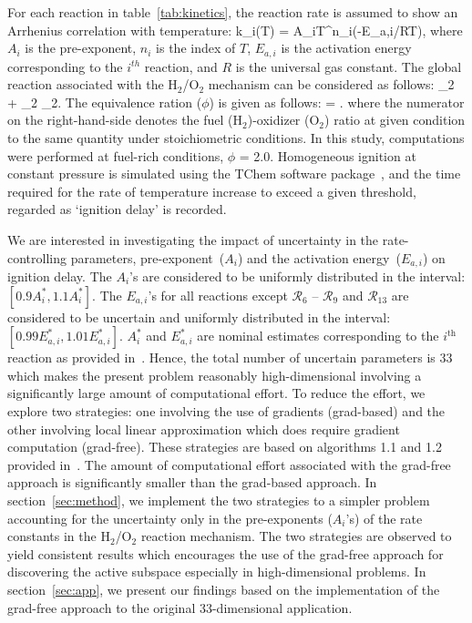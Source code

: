 For each reaction in table~\ref{tab:kinetics}, the reaction rate is assumed to show an Arrhenius
correlation with temperature:
%
\be
k_i(T) = A_iT^{n_i}\exp(-E_{a,i}/RT), 
\label{eq:rate}
\ee
%
where $A_i$ is the pre-exponent, $n_i$ is the index of $T$, $E_{a,i}$ is the
activation energy corresponding to the $i^{th}$ reaction, and $R$ is the
universal gas constant.  The global reaction associated with the H$_2$/O$_2$ mechanism can
be considered as follows:
%
_2 + _2 _2.
\label{eq:global}
\ee 
%
The equivalence ration ($\phi$) is given as follows:
%
\be
\phi = .
\label{eq:phi}
\ee
%
where the numerator on the right-hand-side denotes the fuel (H$_2$)-oxidizer (O$_2$) ratio at given
condition to the same quantity under stoichiometric conditions. In this study, computations were performed
at fuel-rich conditions, $\phi$ = 2.0. Homogeneous ignition at constant pressure is simulated using the
TChem software package~\cite{Safta:2011}, and the time required for the rate of temperature increase
to exceed a given threshold, regarded as `ignition delay' is recorded. 

We are interested in investigating the impact of uncertainty in the rate-controlling parameters, 
pre-exponent~($A_i$) and the activation energy~($E_{a,i}$) on ignition delay. The $A_i$'s are
considered to be uniformly distributed in the interval: $[0.9A_i^\ast, 1.1A_i^\ast]$.
The $E_{a,i}$'s for all reactions except $\mathcal{R}_6$ -- $\mathcal{R}_9$ and $\mathcal{R}_{13}$
are considered to be uncertain and uniformly distributed in the interval: $[0.99E_{a,i}^\ast, 1.01E_{a,i}^\ast]$.
$A_i^\ast$ and $E_{a,i}^\ast$ are nominal estimates corresponding to the $i^\text{th}$ reaction
as provided in~\cite{Yetter:1991}. Hence, the total number of uncertain parameters is 33 which makes the
present problem reasonably high-dimensional involving a significantly large amount of computational
effort. To reduce the effort, we explore two strategies: one involving the use of gradients (grad-based)
and the other involving local linear approximation which does require gradient computation (grad-free).
These strategies are based on algorithms 1.1 and 1.2 provided  in~\cite{Constantine:2015}. The amount of 
computational effort associated with the grad-free approach is significantly smaller than the grad-based
approach. In section~\ref{sec:method}, we implement the two strategies to a simpler problem accounting for the
uncertainty only in the pre-exponents ($A_i$'s) of the rate constants in the H$_2$/O$_2$ reaction mechanism.
The two strategies are observed to yield consistent results which encourages the use of the grad-free approach
for discovering the active subspace especially in high-dimensional problems. In section~\ref{sec:app}, we present
our findings based on the implementation of the grad-free approach to the original 33-dimensional application. 

